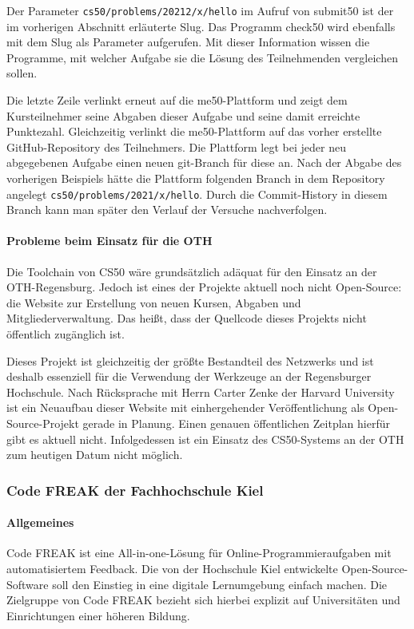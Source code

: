 Der Parameter \texttt{cs50/problems/20212/x/hello} im Aufruf von submit50 ist
der im vorherigen Abschnitt erläuterte Slug. Das Programm check50 wird ebenfalls
mit dem Slug als Parameter aufgerufen. Mit dieser Information wissen die
Programme, mit welcher Aufgabe sie die Lösung des Teilnehmenden vergleichen
sollen.

Die letzte Zeile verlinkt erneut auf die me50-Plattform und zeigt dem
Kursteilnehmer seine Abgaben dieser Aufgabe und seine damit erreichte
Punktezahl. Gleichzeitig verlinkt die me50-Plattform auf das vorher erstellte
GitHub-Repository des Teilnehmers. Die Plattform legt bei jeder neu abgegebenen
Aufgabe einen neuen git-Branch für diese an. Nach der Abgabe des vorherigen
Beispiels hätte die Plattform folgenden Branch in dem Repository angelegt
\texttt{cs50/problems/2021/x/hello}. Durch die Commit-History in diesem Branch 
kann man später den Verlauf der Versuche nachverfolgen.

\paragraph{Probleme beim Einsatz für die OTH}
Die Toolchain von CS50 wäre grundsätzlich adäquat für den Einsatz an der
OTH-Regensburg. Jedoch ist eines der Projekte aktuell noch nicht Open-Source:
die Website zur Erstellung von neuen Kursen, Abgaben und Mitgliederverwaltung. 
Das heißt, dass der Quellcode dieses Projekts nicht öffentlich zugänglich ist.

Dieses Projekt ist gleichzeitig der größte Bestandteil des Netzwerks und ist
deshalb essenziell für die Verwendung der Werkzeuge an der Regensburger
Hochschule. Nach Rücksprache mit Herrn Carter Zenke der Harvard University ist
ein Neuaufbau dieser Website mit einhergehender Veröffentlichung als
Open-Source-Projekt gerade in Planung. Einen genauen öffentlichen Zeitplan
hierfür gibt es aktuell nicht. Infolgedessen ist ein Einsatz des CS50-Systems an
der OTH zum heutigen Datum nicht möglich.

\newpage
\subsubsection{Code FREAK der Fachhochschule Kiel}\label{code-freak}
\paragraph{Allgemeines}
Code FREAK ist eine All-in-one-Lösung für Online-Programmieraufgaben mit
automatisiertem Feedback. Die von der Hochschule Kiel entwickelte
Open-Source-Software soll den Einstieg in eine digitale Lernumgebung einfach
machen. Die Zielgruppe von Code FREAK bezieht sich hierbei explizit auf
Universitäten und Einrichtungen einer höheren Bildung.
\parencite{codefreak-startseite}

